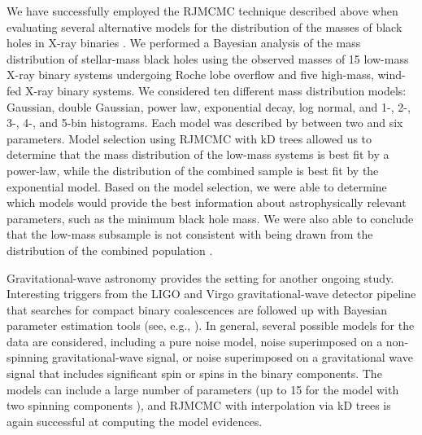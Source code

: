 \documentclass[prd,preprint]{revtex4}
\begin{document}
We have successfully employed the RJMCMC technique described above
when evaluating several alternative models for the distribution of the
masses of black holes in X-ray binaries \cite{Farr2010}.  We
performed a Bayesian analysis of the mass distribution of stellar-mass
black holes using the observed masses of 15 low-mass X-ray binary
systems undergoing Roche lobe overflow and five high-mass, wind-fed
X-ray binary systems.  We considered ten different mass distribution
models: Gaussian, double Gaussian, power law, exponential decay, log
normal, and 1-, 2-, 3-, 4-, and 5-bin histograms.  Each model was
described by between two and six parameters.  Model selection using
RJMCMC with kD trees allowed us to determine that the mass
distribution of the low-mass systems is best fit by a power-law, while
the distribution of the combined sample is best fit by the exponential
model.  Based on the model selection, we were able to determine which
models would provide the best information about astrophysically
relevant parameters, such as the minimum black hole mass.  We were
also able to conclude that the low-mass subsample is not consistent
with being drawn from the distribution of the combined population
\cite{Farr2010}.

Gravitational-wave astronomy provides the setting for another ongoing
study.  Interesting triggers from the LIGO \cite{InitLIGO} and Virgo \cite{Virgo}
gravitational-wave detector pipeline that searches for compact binary
coalescences are followed up with Bayesian parameter estimation tools (see, e.g., \cite{Rover:2006ni, vanderSluys:2008b, VeitchVecchio:2009}).
In general, several possible models for the data are considered,
including a pure noise model, noise superimposed on a non-spinning
gravitational-wave signal, or noise superimposed on a gravitational
wave signal that includes significant spin or spins in the binary
components.  The models can include a large number of parameters (up
to 15 for the model with two spinning components \cite{Raymond:2010}), and RJMCMC with
interpolation via kD trees is again successful at computing the model
evidences. 
\end{document}
